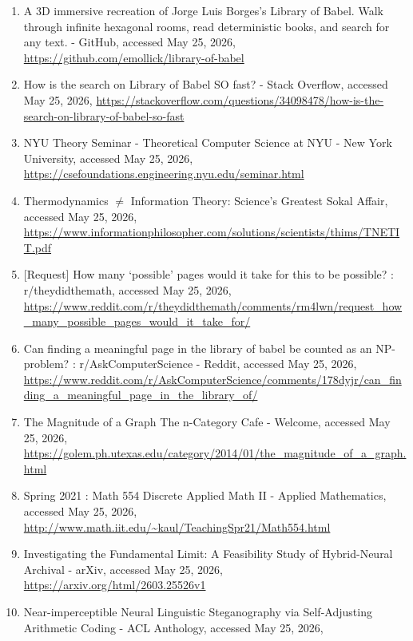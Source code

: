 \documentclass[
  11pt,
  a4paper,
]{article}
\begin{document}
\begin{enumerate}
  How many bytes of storage would the Library of Babel take if it was stored in a digital format? - Quora, accessed May 25, 2026,
  \url{https://www.quora.com/How-many-bytes-of-storage-would-the-Library-of-Babel-take-if-it-was-stored-in-a-digital-format}
\item
  A 3D immersive recreation of Jorge Luis Borges's Library of Babel. Walk through infinite hexagonal rooms, read deterministic books, and search for any text. - GitHub, accessed May 25, 2026,
  \url{https://github.com/emollick/library-of-babel}
\item
  How is the search on Library of Babel SO fast? - Stack Overflow, accessed May 25, 2026,
  \url{https://stackoverflow.com/questions/34098478/how-is-the-search-on-library-of-babel-so-fast}
\item
  NYU Theory Seminar - Theoretical Computer Science at NYU - New York University, accessed May 25, 2026,
  \url{https://csefoundations.engineering.nyu.edu/seminar.html}
\item
  Thermodynamics $\ne$ Information Theory: Science's Greatest Sokal Affair, accessed May 25, 2026,
  \url{https://www.informationphilosopher.com/solutions/scientists/thims/TNETIT.pdf}
\item
  {[}Request{]} How many `possible' pages would it take for this to be possible? : r/theydidthemath, accessed May 25, 2026,
  \url{https://www.reddit.com/r/theydidthemath/comments/rm4lwn/request_how_many_possible_pages_would_it_take_for/}
\item
  Can finding a meaningful page in the library of babel be counted as an NP-problem? : r/AskComputerScience - Reddit, accessed May 25, 2026,
  \url{https://www.reddit.com/r/AskComputerScience/comments/178dyjr/can_finding_a_meaningful_page_in_the_library_of/}
\item
  The Magnitude of a Graph \textbar{} The n-Category Cafe - Welcome, accessed May 25, 2026,
  \url{https://golem.ph.utexas.edu/category/2014/01/the_magnitude_of_a_graph.html}
\item
  Spring 2021 : Math 554 Discrete Applied Math II - Applied Mathematics, accessed May 25, 2026,
  \url{http://www.math.iit.edu/~kaul/TeachingSpr21/Math554.html}
\item
  Investigating the Fundamental Limit: A Feasibility Study of Hybrid-Neural Archival - arXiv, accessed May 25, 2026,
  \url{https://arxiv.org/html/2603.25526v1}
\item
  Near-imperceptible Neural Linguistic Steganography via Self-Adjusting Arithmetic Coding - ACL Anthology, accessed May 25, 2026,

\end{enumerate}
\end{document}
